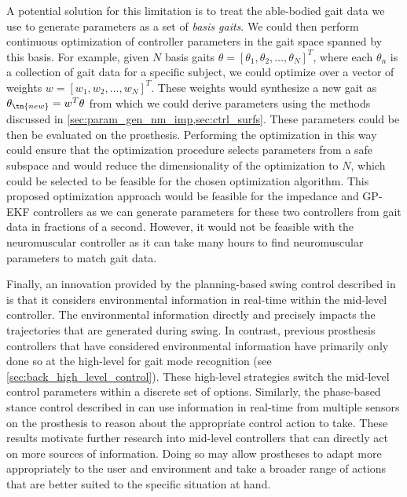 A potential solution for this limitation is to treat the able-bodied gait data
we use to generate parameters as a set of \emph{basis gaits}. We could then
perform continuous optimization of controller parameters in the gait space
spanned by this basis. For example, given $N$ basis gaits $\theta = [\theta_1,
\theta_2, \ldots, \theta_N]^T$, where each $\theta_n$ is a collection of gait
data for a specific subject, we could optimize over a vector of weights $w =
[w_1, w_2, \ldots, w_N]^T$. These weights would synthesize a new gait as
$\theta_\tn{new} = w^T \theta$ from which we could derive parameters using the
methods discussed in \cref{sec:param_gen_nm_imp,sec:ctrl_surfs}. These
parameters could be then be evaluated on the prosthesis. Performing the
optimization in this way could ensure that the optimization procedure selects
parameters from a safe subspace and would reduce the dimensionality of the
optimization to $N$, which could be selected to be feasible for the chosen
optimization algorithm. This proposed optimization approach would be feasible
for the impedance and GP-EKF controllers as we can generate parameters for these
two controllers from gait data in fractions of a second. However, it would not
be feasible with the neuromuscular controller as it can take many hours to find
neuromuscular parameters to match gait data.

Finally, an innovation provided by the planning-based swing control described in
is that it considers environmental information in real-time within the mid-level
controller. The environmental information directly and precisely impacts the
trajectories that are generated during swing. In contrast, previous prosthesis
controllers that have considered environmental information have primarily only
done so at the high-level for gait mode recognition (see
\cref{sec:back_high_level_control}). These high-level strategies switch the
mid-level control parameters within a discrete set of options. Similarly, the
phase-based stance control described in
can use information in real-time from multiple sensors on the prosthesis to
reason about the appropriate control action to take. These results motivate
further research into mid-level controllers that can directly act on more
sources of information. Doing so may allow prostheses to adapt more
appropriately to the user and environment and take a broader range of actions
that are better suited to the specific situation at hand. 


